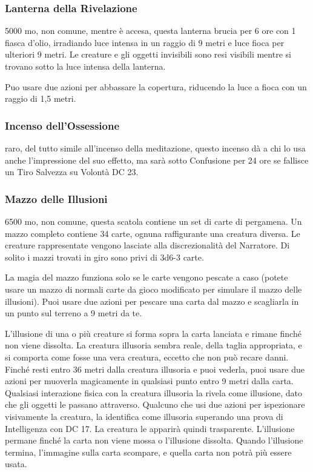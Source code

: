 \begin{multicols}{2}
\subsubsection*{Lanterna della Rivelazione}
5000 mo, non comune, mentre è accesa, questa lanterna brucia per 6 ore con 1 fiasca d'olio, irradiando luce intensa in un raggio di 9 metri e luce fioca per ulteriori 9 metri. Le creature e gli oggetti invisibili sono resi visibili mentre si trovano sotto la luce intensa della lanterna.

Puo usare due azioni per abbassare la copertura, riducendo la luce a fioca con un raggio di 1,5 metri.

\subsubsection*{Incenso dell’Ossessione}
raro, del tutto simile all’incenso della meditazione, questo incenso dà a chi lo usa anche l'impressione del suo effetto, ma sarà sotto Confusione per 24 ore se fallisce un Tiro Salvezza su Volontà DC 23.

\subsubsection*{Mazzo delle Illusioni}
6500 mo, non comune, questa scatola contiene un set di carte di pergamena. Un mazzo completo contiene 34 carte, ognuna raffigurante una creatura diversa. Le creature rappresentate vengono lasciate alla discrezionalità del Narratore. Di solito i mazzi trovati in giro sono privi di 3d6-3 carte.

La magia del mazzo funziona solo se le carte vengono pescate a caso (potete usare un mazzo di normali carte da gioco modificato per simulare il mazzo delle illusioni). Puoi usare due azioni per pescare una carta dal mazzo e scagliarla in un punto sul terreno a 9 metri da te.

L'illusione di una o più creature si forma sopra la carta lanciata e rimane finché non viene dissolta. La creatura illusoria sembra reale, della taglia appropriata, e si comporta come fosse una vera creatura, eccetto che non può recare danni. Finché resti entro 36 metri dalla creatura illusoria e puoi vederla, puoi usare due azioni per muoverla magicamente in qualsiasi punto entro 9 metri dalla carta. Qualsiasi interazione fisica con la creatura illusoria la rivela come illusione, dato che gli oggetti le passano attraverso. Qualcuno che usi due azioni per ispezionare visivamente la creatura, la identifica come illusoria superando una prova di Intelligenza con DC 17. La creatura le apparirà quindi trasparente.
L'illusione permane finché la carta non viene mossa o l'illusione dissolta. Quando l'illusione termina, l'immagine sulla carta scompare, e quella carta non potrà più essere usata.

\end{multicols}

